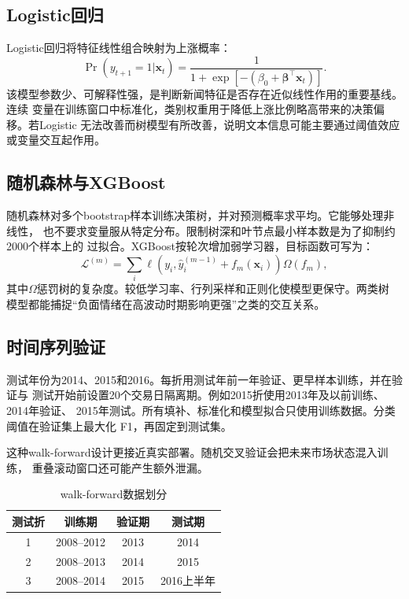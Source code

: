 \documentclass[UTF8,a4paper,10pt,twocolumn,fontset=none]{ctexart}
\begin{document}
\subsection{Logistic回归}

Logistic回归将特征线性组合映射为上涨概率：
\begin{equation}
\Pr(y_{t+1}=1|\boldsymbol{x}_t)
=\frac{1}{1+\exp[-(\beta_0+\boldsymbol{\beta}^{\top}\boldsymbol{x}_t)]}.
\end{equation}
该模型参数少、可解释性强，是判断新闻特征是否存在近似线性作用的重要基线。连续
变量在训练窗口中标准化，类别权重用于降低上涨比例略高带来的决策偏移。若Logistic
无法改善而树模型有所改善，说明文本信息可能主要通过阈值效应或变量交互起作用。

\subsection{随机森林与XGBoost}

随机森林对多个bootstrap样本训练决策树，并对预测概率求平均。它能够处理非线性，
也不要求变量服从特定分布。限制树深和叶节点最小样本数是为了抑制约2000个样本上的
过拟合。XGBoost按轮次增加弱学习器，目标函数可写为：
\begin{equation}
\mathcal{L}^{(m)}
=\sum_i \ell(y_i,\hat{y}^{(m-1)}_i+f_m(\boldsymbol{x}_i))
\Omega(f_m),
\end{equation}
其中$\Omega$惩罚树的复杂度。较低学习率、行列采样和正则化使模型更保守。两类树
模型都能捕捉“负面情绪在高波动时期影响更强”之类的交互关系。

\subsection{时间序列验证}

测试年份为2014、2015和2016。每折用测试年前一年验证、更早样本训练，并在验证与
测试开始前设置20个交易日隔离期。例如2015折使用2013年及以前训练、2014年验证、
2015年测试。所有填补、标准化和模型拟合只使用训练数据。分类阈值在验证集上最大化
F1，再固定到测试集。

这种walk-forward设计更接近真实部署。随机交叉验证会把未来市场状态混入训练，
重叠滚动窗口还可能产生额外泄漏\cite{lop}。

\begin{table}[t]
\centering
\caption{walk-forward数据划分}
\small
\begin{tabular}{cccc}
\toprule
测试折 & 训练期 & 验证期 & 测试期\\
\midrule
1 & 2008--2012 & 2013 & 2014\\
2 & 2008--2013 & 2014 & 2015\\
3 & 2008--2014 & 2015 & 2016上半年\\
\bottomrule
\end{tabular}
\label{tab:folds}
\end{table}
\end{document}
